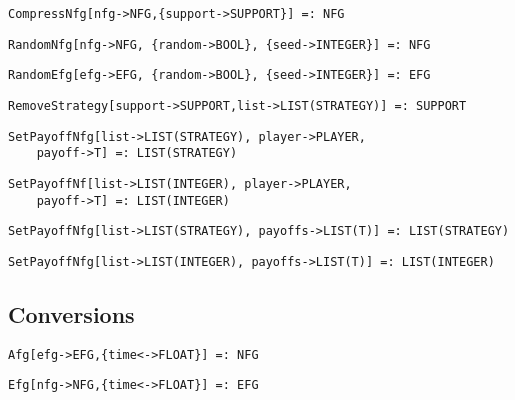 \protect \large \begin{verbatim}
CompressNfg[nfg->NFG,{support->SUPPORT}] =: NFG
\end{verbatim}\normalsize

\protect \large \begin{verbatim}
RandomNfg[nfg->NFG, {random->BOOL}, {seed->INTEGER}] =: NFG
\end{verbatim}\normalsize

\protect \large \begin{verbatim}
RandomEfg[efg->EFG, {random->BOOL}, {seed->INTEGER}] =: EFG
\end{verbatim}\normalsize

\protect \large \begin{verbatim}
RemoveStrategy[support->SUPPORT,list->LIST(STRATEGY)] =: SUPPORT
\end{verbatim}\normalsize

\protect \large \begin{verbatim}
SetPayoffNfg[list->LIST(STRATEGY), player->PLAYER, 
	payoff->T] =: LIST(STRATEGY)
\end{verbatim}\normalsize

\protect \large \begin{verbatim}
SetPayoffNf[list->LIST(INTEGER), player->PLAYER, 
	payoff->T] =: LIST(INTEGER)
\end{verbatim}\normalsize

\protect \large \begin{verbatim}
SetPayoffNfg[list->LIST(STRATEGY), payoffs->LIST(T)] =: LIST(STRATEGY)
\end{verbatim}\normalsize

\protect \large \begin{verbatim}
SetPayoffNfg[list->LIST(INTEGER), payoffs->LIST(T)] =: LIST(INTEGER)
\end{verbatim}\normalsize

\medskip
\subsection{Conversions}


\protect \large \begin{verbatim}
Afg[efg->EFG,{time<->FLOAT}] =: NFG
\end{verbatim}\normalsize


\protect \large \begin{verbatim}
Efg[nfg->NFG,{time<->FLOAT}] =: EFG
\end{verbatim}\normalsize


